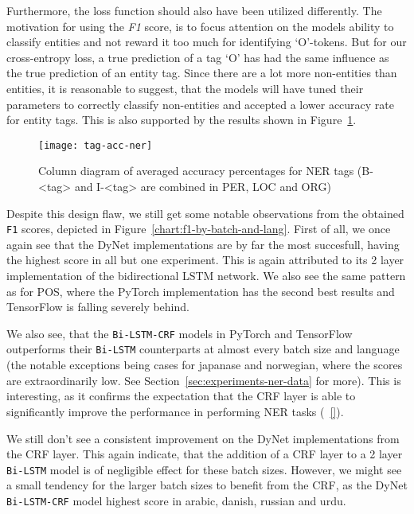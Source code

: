 Furthermore, the loss function should also have been utilized differently. The
motivation for using the \textit{F1} score, is to focus attention on the models
ability to classify entities and not reward it too much for identifying
`O'-tokens. But for our cross-entropy loss, a true prediction of a tag `O' has
had the same influence as the true prediction of an entity tag. Since there are
a lot more non-entities than entities, it is reasonable to suggest, that the
models will have tuned their parameters to correctly classify non-entities and
accepted a lower accuracy rate for entity tags. This is also supported by the
results shown in Figure~\ref{chart:tag-acc-ner}.

\begin{figure}[h!]
    \texttt{[image: tag-acc-ner]}
    \caption{Column diagram of averaged accuracy percentages for NER tags
        (B-<tag> and I-<tag> are combined in PER, LOC and ORG)
    }\label{chart:tag-acc-ner}
\end{figure}

Despite this design flaw, we still get some notable observations from the
obtained \texttt{F1} scores, depicted in
Figure~\ref{chart:f1-by-batch-and-lang}.  First of all, we once again see that
the DyNet implementations are by far the most succesfull, having the highest
score in all but one experiment. This is again attributed to its 2 layer
implementation of the bidirectional LSTM network. We also see the same pattern
as for POS, where the PyTorch implementation has the second best results and
TensorFlow is falling severely behind.

We also see, that the \texttt{Bi-LSTM-CRF} models in PyTorch and TensorFlow
outperforms their \texttt{Bi-LSTM} counterparts at almost every batch size and
language (the notable exceptions being cases for japanase and norwegian, where
the scores are extraordinarily low. See Section~\ref{sec:experiments-ner-data}
for more). This is interesting, as it confirms the expectation that the CRF
layer is able to significantly improve the performance in performing NER tasks
(~\ref{}).

We still don't see a consistent improvement on the DyNet implementations from
the CRF layer. This again indicate, that the addition of a CRF
layer to a 2 layer \texttt{Bi-LSTM} model is of negligible effect for these
batch sizes. However, we might see a small tendency for the larger batch sizes
to benefit from the CRF, as the DyNet \texttt{Bi-LSTM-CRF} model highest score
in arabic, danish, russian and urdu.

